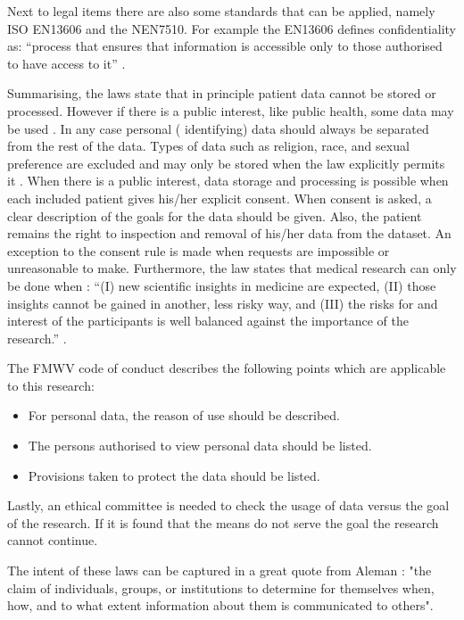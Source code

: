 Next to legal items there are also some standards that can be applied, namely ISO EN13606 and the NEN7510.
For example the EN13606 defines confidentiality as: ``process that ensures that information is accessible only to those authorised to have access to it'' \cite{s8FernandezAleman2013}.

Summarising, the laws state that in principle patient data cannot be stored or processed.
However if there is a public interest, like public health, some data may be used \cite{s19Mouw2012}.
In any case personal (\ie{} identifying) data should always be separated from the rest of the data.
Types of data such as religion, race, and sexual preference are excluded and may only be stored when the law explicitly permits it \cite{s19Mouw2012}.
When there is a public interest, data storage and processing is possible when each included patient gives his/her explicit consent.
When consent is asked, a clear description of the goals for the data should be given.
Also, the patient remains the right to inspection and removal of his/her data from the dataset.
An exception to the consent rule is made when requests are impossible or unreasonable to make.
Furthermore, the law states that medical research can only be done when : ``(I) new scientific insights in medicine are expected, (II) those insights cannot be gained in another, less risky way, and (III) the risks for and interest of the participants is well balanced against the importance of the research.'' \cite{s19Mouw2012}.

The FMWV code of conduct describes the following points which are applicable to this research:

\begin{itemize}
	\item For personal data, the reason of use should be described.
	\item The persons authorised to view personal data should be listed.
	\item Provisions taken to protect the data should be listed.
\end{itemize}

Lastly, an ethical committee is needed to check the usage of data versus the goal of the research.
If it is found that the means do not serve the goal the research cannot continue.

The intent of these laws can be captured in a great quote from Aleman \cite{s8FernandezAleman2013}: "the claim of individuals, groups, or institutions to determine for themselves when, how, and to what extent information about them is communicated to others".